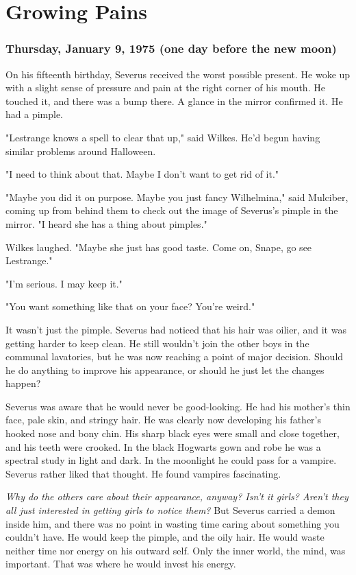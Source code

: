 
\chapter{Growing Pains}

\subsection{Thursday, January 9, 1975 (one day before the new moon)}

On his fifteenth birthday, Severus received the worst possible present. He woke up with a slight sense of pressure and pain at the right corner of his mouth. He touched it, and there was a bump there. A glance in the mirror confirmed it. He had a pimple.

"Lestrange knows a spell to clear that up," said Wilkes. He'd begun having similar problems around Halloween.

"I need to think about that. Maybe I don't want to get rid of it."

"Maybe you did it on purpose. Maybe you just fancy Wilhelmina," said Mulciber, coming up from behind them to check out the image of Severus's pimple in the mirror. "I heard she has a thing about pimples."

Wilkes laughed. "Maybe she just has good taste. Come on, Snape, go see Lestrange."

"I'm serious. I may keep it."

"You want something like that on your face? You're weird."

It wasn't just the pimple. Severus had noticed that his hair was oilier, and it was getting harder to keep clean. He still wouldn't join the other boys in the communal lavatories, but he was now reaching a point of major decision. Should he do anything to improve his appearance, or should he just let the changes happen?

Severus was aware that he would never be good-looking. He had his mother's thin face, pale skin, and stringy hair. He was clearly now developing his father's hooked nose and bony chin. His sharp black eyes were small and close together, and his teeth were crooked. In the black Hogwarts gown and robe he was a spectral study in light and dark. In the moonlight he could pass for a vampire. Severus rather liked that thought. He found vampires fascinating.

\emph{Why do the others care about their appearance, anyway? Isn't it girls? Aren't they all just interested in getting girls to notice them?} But Severus carried a demon inside him, and there was no point in wasting time caring about something you couldn't have. He would keep the pimple, and the oily hair. He would waste neither time nor energy on his outward self. Only the inner world, the mind, was important. That was where he would invest his energy.

